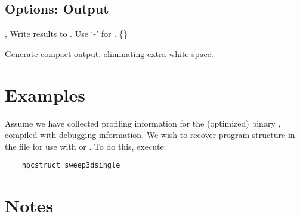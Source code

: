 \documentclass[english]{article}
\begin{document}
\subsection{Options: Output}
\item[\OptArg{-o}{file}, \OptArg{--output}{file}]
Write results to .  Use `-' for . \{\}

\begin{Description}
\item[\Opt{--compact}]
Generate compact output, eliminating extra white space.


\end{Description}

\section{Examples}

Assume we have collected profiling information for the (optimized) binary , compiled with debugging information.
We wish to recover program structure in the file  for use with  or .
To do this, execute:
\begin{verbatim}
    hpcstruct sweep3dsingle
\end{verbatim}


\section{Notes}
\end{document}
